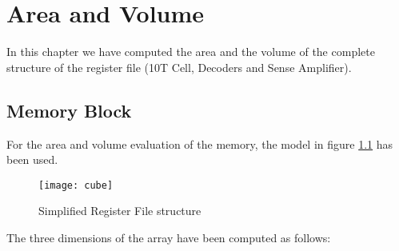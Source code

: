 \chapter{Area and Volume}
\graphicspath{{foto/Chap4/}}
In this chapter we have computed the area and the volume of the complete structure of the register file (10T Cell, Decoders and Sense Amplifier).

\section{Memory Block}
For the area and volume evaluation of the memory, the model in figure \ref{fig:cube} has been used.

\begin{center}
	\begin{figure}[H]
		\centering
		\texttt{[image: cube]}
		\caption{Simplified Register File structure}
		\label{fig:cube}
	\end{figure}
\end{center}

The three dimensions of the array have been computed as follows:

